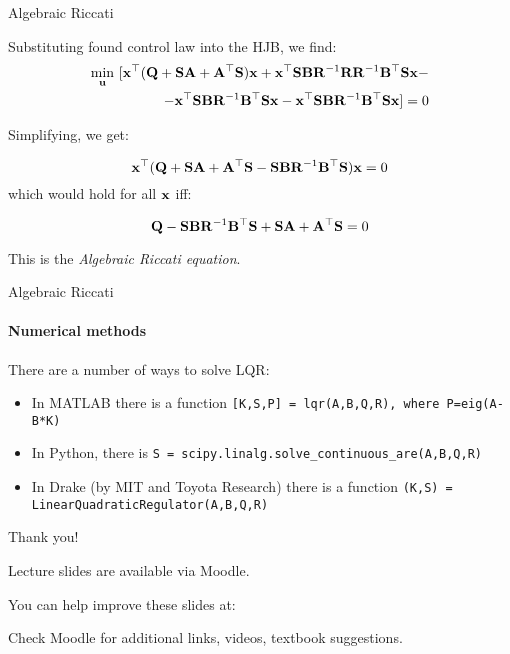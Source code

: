 \documentclass{beamer}
\begin{document}
\begin{frame}{Algebraic Riccati}
\begin{flushleft}

Substituting found control law into the HJB, we find:
\begin{equation}
\begin{split}
\underset{\bo{u}}{\min} \ 
[ 
\bo{x}^\top (
\bo{Q} + \bo{S} \bo{A} + \bo{A}^\top \bo{S}
)\bo{x}
+
\bo{x}^\top \bo{S} \bo{B} \bo{R}^{-1} \bo{R} \mathbf  R^{-1} \bo{B}^\top \bo{S} \bo{x}
- \\
- 
\bo{x}^\top \bo{S} \bo{B} \bo{R}^{-1} \bo{B}^\top \bo{S} \bo{x}
- 
\bo{x}^\top\bo{S} \bo{B} \bo{R}^{-1} \bo{B}^\top \bo{S} \bo{x} 
] = 0
\end{split}
\end{equation}

Simplifying, we get: 

\begin{equation}
\mathbf{x}^\top (\mathbf{Q} + \mathbf{S} \mathbf{A} + \mathbf{A}^\top \mathbf{S}
- \mathbf{S} \mathbf{B} \mathbf{R}^{-1} \mathbf{B}^\top \mathbf{S}) \mathbf{x} = 0
\end{equation}
%
which would hold for all $\mathbf{x}$ iff:
%

\begin{equation}
\mathbf{Q} - \mathbf{S} \mathbf{B} \mathbf{R}^{-1} \mathbf{B}^\top \mathbf{S} 
 + \mathbf{S} \mathbf{A} + \mathbf{A}^\top \mathbf{S} = 0
\end{equation}

This is the \emph{Algebraic Riccati equation}.

\end{flushleft}
\end{frame}

\begin{frame}{Algebraic Riccati}
\framesubtitle{Numerical methods}
\begin{flushleft}

There are a number of ways to solve LQR:

\bigskip

\begin{itemize}
    \item In MATLAB there is a function \texttt{[K,S,P] = lqr(A,B,Q,R), where P=eig(A-B*K)}
    \item In Python, there is \texttt{S = scipy.linalg.solve\_continuous\_are(A,B,Q,R)}
    \item In Drake (by MIT and Toyota Research) there is a function \texttt{(K,S) = LinearQuadraticRegulator(A,B,Q,R)}
\end{itemize}

\end{flushleft}
\end{frame}




\begin{frame}{Thank you!}
	\centerline{Lecture slides are available via Moodle.}
	\bigskip
	\centerline{You can help improve these slides at:}
	\centerline{\mygit}
	\bigskip
	\centerline{Check Moodle for additional links, videos, textbook suggestions.}
	\bigskip
	
	\centerline{\textcolor{black}{}}
\end{frame}
\end{document}
